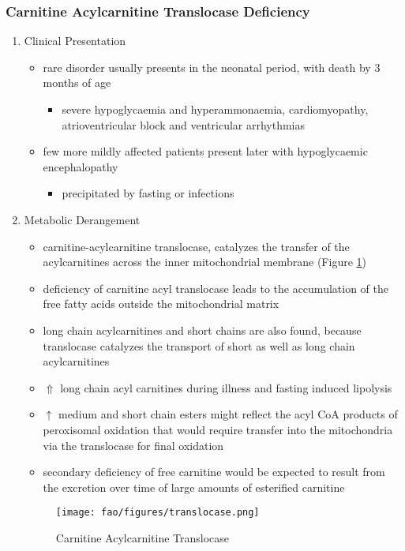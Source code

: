 \documentclass{scrartcl}
\begin{document}
\subsubsection{Carnitine Acylcarnitine Translocase Deficiency}
\label{sec:org34bf60c}
\begin{enumerate}
\item Clinical Presentation
\label{sec:orgc4a00c3}
\begin{itemize}
\item rare disorder usually presents in the neonatal period, with
death by 3 months of age
\begin{itemize}
\item severe hypoglycaemia and hyperammonaemia, cardiomyopathy,
atrioventricular block and ventricular arrhythmias
\end{itemize}
\item few more mildly affected patients present later with hypoglycaemic
encephalopathy
\begin{itemize}
\item precipitated by fasting or infections
\end{itemize}
\end{itemize}
\item Metabolic Derangement
\label{sec:org871ccf1}
\begin{itemize}
\item carnitine-acylcarnitine translocase, catalyzes the transfer of the
acylcarnitines across the inner mitochondrial membrane (Figure \ref{fig:org4a6bd5e})
\item deficiency of carnitine acyl translocase leads to the accumulation
of the free fatty acids outside the mitochondrial matrix
\item long chain acylcarnitines and short chains are also found, because
translocase catalyzes the transport of short as well as long chain
acylcarnitines
\item \(\Uparrow\) long chain acyl carnitines during illness and fasting
induced lipolysis
\item \(\uparrow\) medium and short chain esters might reflect the acyl CoA products
of peroxisomal oxidation that would require transfer into the
mitochondria via the translocase for final oxidation
\item secondary deficiency of free carnitine would be expected to result
from the excretion over time of large amounts of esterified
carnitine
\end{itemize}

\begin{figure}[htbp]
\centering
\texttt{[image: fao/figures/translocase.png]}
\caption{\label{fig:org4a6bd5e}Carnitine Acylcarnitine Translocase}
\end{figure}


\end{enumerate}
\end{document}
